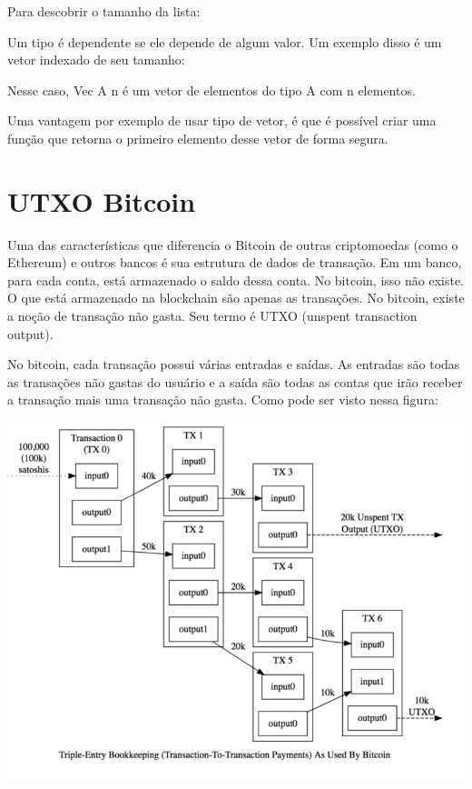 \documentclass[12pt]{report}
\begin{document}
Para descobrir o tamanho da lista:


Um tipo é dependente se ele depende de algum valor. Um exemplo disso é um vetor indexado de seu tamanho:


Nesse caso, Vec A n é um vetor de elementos do tipo A com n elementos.

Uma vantagem por exemplo de usar tipo de vetor, é que é possível criar uma função que retorna o primeiro elemento desse vetor de forma segura.


\section{UTXO Bitcoin}

Uma das características que diferencia o Bitcoin de outras criptomoedas (como o Ethereum) e outros bancos é sua estrutura de dados de transação. Em um banco, para cada conta, está armazenado o saldo dessa conta. No bitcoin, isso não existe. O que está armazenado na blockchain são apenas as transações. No bitcoin, existe a noção de transação não gasta. Seu termo é UTXO (unspent transaction output).

No bitcoin, cada transação possui várias entradas e saídas. As entradas são todas as transações não gastas do usuário e a saída são todas as contas que irão receber a transação mais uma transação não gasta. Como pode ser visto nessa figura:

\includegraphics[scale = 0.5]{utxo}
\end{document}
